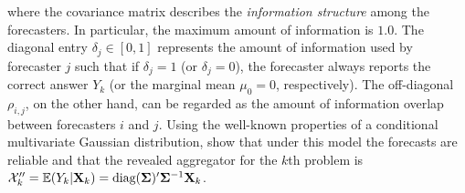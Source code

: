\documentclass[12pt]{article}
\newcommand{\E}{\mathbb{E}}
\theoremstyle{definition}
\theoremstyle{definition}
\def\bSigma{{\bf \Sigma}}
\def\X{{\bf X}}
\def\E{{\mathbb E}}
\def\diag{\text{diag}}
\def\diag{\text{diag}}
\begin{document}
where the covariance matrix describes the \textit{information structure} among the forecasters. In particular, the maximum amount of information is $1.0$. The diagonal entry $\delta_j \in [0,1]$ represents the amount of information used by forecaster $j$ such that if $\delta_j = 1$ (or $\delta_j = 0$), the forecaster always reports the correct answer $Y_k$ (or the marginal mean $\mu_0 = 0$, respectively). The off-diagonal $\rho_{i,j}$, on the other hand, can be regarded as the amount of information overlap between forecasters $i$ and $j$. Using the  well-known properties of a conditional multivariate Gaussian distribution, \cite{satopaamodeling2, satopaamodeling} show that under this model the forecasts are reliable
%
and that the revealed aggregator for the $k$th problem is  $\mathcal{X}_k''  = \E(Y_k | \X_k) = \diag(\bSigma)'\bSigma^{-1}\X_k$. 


\end{document}
